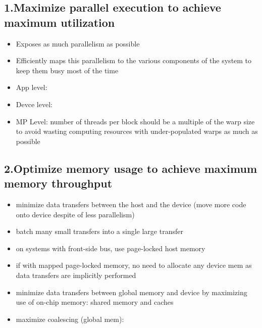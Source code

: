 \subsection*{1.Maximize parallel execution to achieve maximum utilization}
\begin{itemize}
\item Exposes as much parallelism as possible
\item Efficiently maps this parallelism to the various components of the system to keep them busy most of the time
\item App level:
\item Devce level:
\item MP Level: number of threads per block should be a multiple of the warp size to avoid wasting computing resources with under-populated warps as much as possible
\end{itemize}
\subsection*{2.Optimize memory usage to achieve maximum memory throughput}
\begin{itemize}
\item minimize data transfers between the host and the device (move more code onto device despite of less parallelism)
\item batch many small transfers into a single large transfer
\item on systems with front-side bus, use page-locked host memory
\item if with mapped page-locked memory, no need to allocate any device mem as data transfers are implicitly performed
\item minimize data transfers between global memory and device by maximizing use of on-chip memory: shared memory and caches
\item maximize coalescing (global mem):
\end{itemize}
